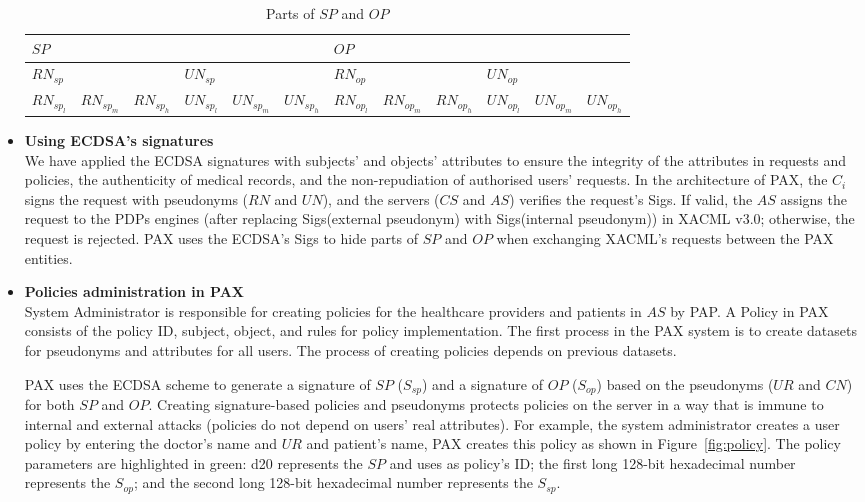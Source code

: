\documentclass[journal,article,submit,moreauthors,pdftex]{Definitions/mdpi}
\begin{document}
\begin{itemize}
\begin{table}[]
\begin{center}
\caption{Parts of $SP$ and $OP$}
\scriptsize
\begin{tabular}{|l|l|l|l|l|l|l|l|l|l|l|l|}
\hline
\multicolumn{6}{|l|}{$SP$}                               & \multicolumn{6}{l|}{$OP$}                               \\ \hline
\multicolumn{3}{|l|}{$RN_{sp}$} & \multicolumn{3}{l|}{$UN_{sp}$} & \multicolumn{3}{l|}{$RN_{op}$} & \multicolumn{3}{l|}{$UN_{op}$} \\ \hline
$RN_{sp_l}$   & $RN_{sp_m}$   & $RN_{sp_h}$  & $UN_{sp_l}$   & $UN_{sp_m}$  & $UN_{sp_h}$  & $RN_{op_l}$   & $RN_{op_m}$  & $RN_{op_h}$  & $UN_{op_l}$   & $UN_{op_m}$  & $UN_{op_h}$  \\ \hline
\end{tabular}
\label{tab:sp_op_pseudonym}
\end{center}
\end{table}

\item \textbf{Using ECDSA's signatures}\\
We have applied the ECDSA signatures with subjects' and objects' attributes to ensure the
integrity of the attributes in requests and policies, the authenticity of medical records, and
the non-repudiation of authorised users' requests. In the architecture of PAX, the $C_i$ signs
the request with pseudonyms ($RN$ and $UN$), and the servers ($CS$ and $AS$) verifies the request's Sigs. If valid, the $AS$ assigns the request to the PDPs engines (after replacing Sigs(external pseudonym) with Sigs(internal pseudonym)) in XACML v3.0; otherwise, the request is rejected.
PAX uses the ECDSA's Sigs to hide parts of $SP$ and $OP$ when exchanging XACML's requests
between the PAX entities.

\item \textbf{Policies administration in PAX}\\
System Administrator is responsible for creating policies for the healthcare providers and
patients in $AS$ by PAP. A Policy in PAX consists of the policy ID, subject, object, and rules
for policy implementation. The first process in the PAX system is to create
datasets for pseudonyms and attributes for all users. The process of creating
policies depends on previous datasets.

PAX uses the ECDSA scheme to generate a signature of $SP$ ($S_{sp}$) and a signature of
$OP$ ($S_{op}$) based on the pseudonyms ($UR$ and $CN$) for both $SP$ and $OP$.
Creating signature-based policies and pseudonyms protects policies on the server
in a way that is immune to internal and external attacks (policies do not depend
on users' real attributes). For example, the system administrator creates a user
policy by entering the doctor's name and $UR$ and patient's name, PAX creates
this policy as shown in Figure~\ref{fig:policy}. The policy parameters are highlighted
in green: d20 represents the $SP$ and uses as policy's ID; the first long 128-bit
hexadecimal number represents the $S_{op}$; and the second long 128-bit hexadecimal
number represents the $S_{sp}$.


\end{itemize}
\end{document}
